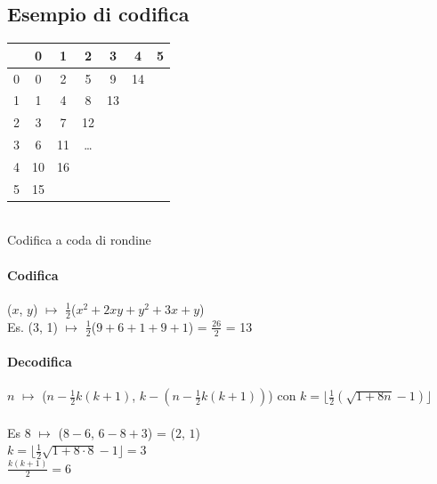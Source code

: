 \documentclass[10pt]{book}
\begin{document}
\subsection{Esempio di codifica}
\begin{multicols}{2}
\begin{center}
	\begin{tabular}{c || c | c | c | c | c | c}
	 & 0 & 1 & 2 & 3 & 4 & 5 \\
	 \hline
	 \hline
	 0 & 0 & 2 & 5 & 9 & 14 & \\
	 \hline
	 1 & 1 & 4 & 8 & 13 & & \\
	 \hline
	 2 & 3 & 7 & 12 & & & \\
	 \hline
	 3 & 6 & 11 & \ldots & & & \\
	 \hline
	 4 & 10 & 16 & & & & \\
	 \hline
	 5 & 15 & & & & & 
	\end{tabular}\\
	Codifica a coda di rondine
\end{center}
\columnbreak
\paragraph{Codifica} ($x$, $y$) $\mapsto$ $\frac{1}{2}$($x^2 + 2xy + y^2 + 3x + y$)\\
Es. (3, 1) $\mapsto$ $\frac{1}{2}$($9 + 6 + 1 + 9 + 1$) = $\frac{26}{2}$ = 13
\paragraph{Decodifica} $n$ $\mapsto$ ($n - \frac{1}{2}k(k + 1)$, $k - (n - \frac{1}{2}k(k+1))$) con $k = \lfloor\frac{1}{2}(\sqrt{1 + 8n} -1)\rfloor$\\\\
Es 8 $\mapsto$ ($8 - 6$, $6 - 8 + 3$) = ($2$, $1$)\\
$k = \lfloor\frac{1}{2}\sqrt{1 + 8\cdot 8} - 1\rfloor = 3$\\
$\frac{k(k+1)}{2} = 6$
\end{multicols}
\pagebreak
\end{document}
